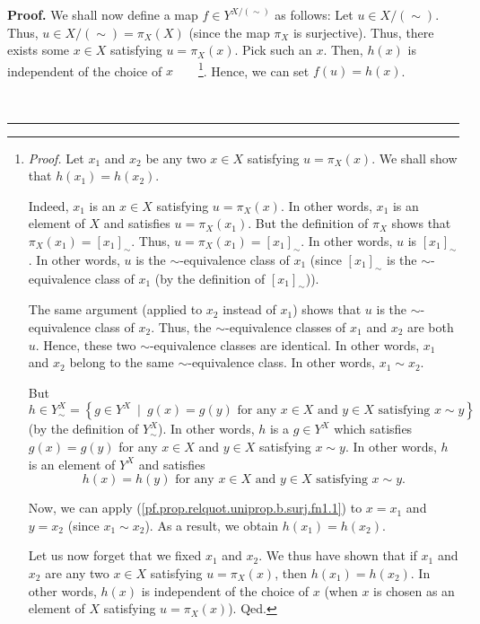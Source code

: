 \documentclass[numbers=enddot,12pt,final,onecolumn,notitlepage]{scrartcl}%
\theoremstyle{definition}
\newenvironment{proof}[1][Proof]{\noindent\textbf{#1.} }{\ \rule{0.5em}{0.5em}}
\newenvironment{verlong}{}{}
\begin{document}
\begin{verlong}
\begin{proof}
We shall now define a map $f\in Y^{X/\left(  \sim\right)  }$ as follows: Let
$u\in X/\left(  \sim\right)  $. Thus, $u\in X/\left(  \sim\right)  =\pi
_{X}\left(  X\right)  $ (since the map $\pi_{X}$ is surjective). Thus, there
exists some $x\in X$ satisfying $u=\pi_{X}\left(  x\right)  $. Pick such an
$x$. Then, $h\left(  x\right)  $ is independent of the choice of
$x$\ \ \ \ \footnote{\textit{Proof.} Let $x_{1}$ and $x_{2}$ be any two $x\in
X$ satisfying $u=\pi_{X}\left(  x\right)  $. We shall show that $h\left(
x_{1}\right)  =h\left(  x_{2}\right)  $.
\par
Indeed, $x_{1}$ is an $x\in X$ satisfying $u=\pi_{X}\left(  x\right)  $. In
other words, $x_{1}$ is an element of $X$ and satisfies $u=\pi_{X}\left(
x_{1}\right)  $. But the definition of $\pi_{X}$ shows that $\pi_{X}\left(
x_{1}\right)  =\left[  x_{1}\right]  _{\sim}$. Thus, $u=\pi_{X}\left(
x_{1}\right)  =\left[  x_{1}\right]  _{\sim}$. In other words, $u$ is $\left[
x_{1}\right]  _{\sim}$. In other words, $u$ is the $\sim$-equivalence class of
$x_{1}$ (since $\left[  x_{1}\right]  _{\sim}$ is the $\sim$-equivalence class
of $x_{1}$ (by the definition of $\left[  x_{1}\right]  _{\sim}$)).
\par
The same argument (applied to $x_{2}$ instead of $x_{1}$) shows that $u$ is
the $\sim$-equivalence class of $x_{2}$. Thus, the $\sim$-equivalence classes
of $x_{1}$ and $x_{2}$ are both $u$. Hence, these two $\sim$-equivalence
classes are identical. In other words, $x_{1}$ and $x_{2}$ belong to the same
$\sim$-equivalence class. In other words, $x_{1}\sim x_{2}$.
\par
But%
\[
h\in Y_{\sim}^{X}=\left\{  g\in Y^{X}\ \mid\ g\left(  x\right)  =g\left(
y\right)  \text{ for any }x\in X\text{ and }y\in X\text{ satisfying }x\sim
y\right\}
\]
(by the definition of $Y_{\sim}^{X}$). In other words, $h$ is a $g\in Y^{X}$
which satisfies $g\left(  x\right)  =g\left(  y\right)  $ for any $x\in X$ and
$y\in X$ satisfying $x\sim y$. In other words, $h$ is an element of $Y^{X}$
and satisfies%
\begin{equation}
h\left(  x\right)  =h\left(  y\right)  \text{ for any }x\in X\text{ and }y\in
X\text{ satisfying }x\sim y. \label{pf.prop.relquot.uniprop.b.surj.fn1.1}%
\end{equation}
\par
Now, we can apply (\ref{pf.prop.relquot.uniprop.b.surj.fn1.1}) to $x=x_{1}$
and $y=x_{2}$ (since $x_{1}\sim x_{2}$). As a result, we obtain $h\left(
x_{1}\right)  =h\left(  x_{2}\right)  $.
\par
Let us now forget that we fixed $x_{1}$ and $x_{2}$. We thus have shown that
if $x_{1}$ and $x_{2}$ are any two $x\in X$ satisfying $u=\pi_{X}\left(
x\right)  $, then $h\left(  x_{1}\right)  =h\left(  x_{2}\right)  $. In other
words, $h\left(  x\right)  $ is independent of the choice of $x$ (when $x$ is
chosen as an element of $X$ satisfying $u=\pi_{X}\left(  x\right)  $). Qed.}.
Hence, we can set $f\left(  u\right)  =h\left(  x\right)  $.


\end{proof}
\end{verlong}
\end{document}
